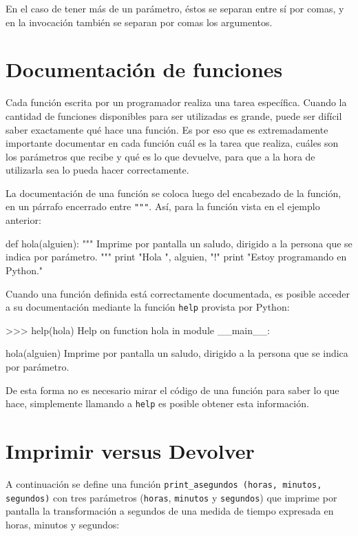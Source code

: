 En el caso de tener más de un parámetro, éstos se separan entre sí por comas,
y en la invocación también se separan por comas los argumentos.

\section{Documentación de funciones}

Cada función escrita por un programador realiza una tarea específica.  Cuando
la cantidad de funciones disponibles para ser utilizadas es grande, puede ser
difícil saber exactamente qué hace una función.  Es por eso que es
extremadamente importante documentar en cada función cuál es la tarea que
realiza, cuáles son los parámetros que recibe y qué es lo que devuelve, para
que a la hora de utilizarla sea lo pueda hacer correctamente.

La documentación de una función se coloca luego del encabezado de la función,
en un párrafo encerrado entre \lstinline!"""!.  Así, para la función vista en
el ejemplo anterior:

\begin{codigo-python-sn}
def hola(alguien):
    """ Imprime por pantalla un saludo, dirigido a la persona que
        se indica por parámetro. """
    print "Hola ", alguien, "!"
    print "Estoy programando en Python."
\end{codigo-python-sn}

Cuando una función definida está correctamente documentada, es posible acceder
a su documentación mediante la función \lstinline!help! provista por Python:

\begin{codigo-python-sn}
>>> help(hola)
Help on function hola in module __main__:

hola(alguien)
    Imprime por pantalla un saludo, dirigido a la persona que
    se indica por parámetro.
\end{codigo-python-sn}

De esta forma no es necesario mirar el código de una función para saber lo que
hace, simplemente llamando a \lstinline!help! es posible obtener esta
información.

\section{Imprimir versus Devolver}

A continuación se define una función
\lstinline+print_asegundos (horas, minutos, segundos)+
con tres parámetros (\lstinline+horas+, \lstinline+minutos+
y \lstinline+segundos+) que imprime por pantalla la transformación a segundos
de una medida de tiempo expresada en horas, minutos y segundos:

